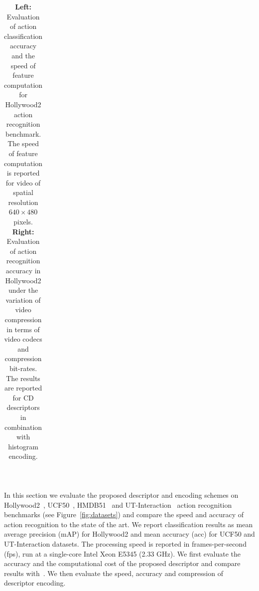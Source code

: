 \documentclass[10pt,twocolumn,letterpaper]{article}
\begin{document}
\begin{table}[t!]
\begin{center}
\begin{tabular}{p{}p{}}
\end{tabular}
\mbox{}\vspace{.1cm}\\
\caption{{\bf Left:} Evaluation of action classification accuracy and the speed of feature computation for Hollywood2 action recognition benchmark. The speed of feature computation is reported for video of spatial resolution $640\times480$ pixels.
{\bf Right:} Evaluation of action recognition accuracy in Hollywood2 under the variation of video compression in terms of video codecs and compression bit-rates. The results are reported for CD descriptors in combination with histogram encoding.
\vspace{-.4cm}}
\label{tab:HWD2}
\end{center}
\end{table}


In this section we evaluate the proposed descriptor and encoding schemes on Hollywood2~\cite{Marszalek09}, UCF50~\cite{Reddy12}, HMDB51~\cite{Kuehne11} and UT-Interaction~\cite{Ryoo10} action recognition benchmarks (see Figure~\ref{fig:datasets}) and compare the speed and accuracy of action recognition  to the state of the art. We report classification results as mean average precision (mAP) for Hollywood2 and mean accuracy (acc) for UCF50 and UT-Interaction datasets. The processing speed is reported in frames-per-second (fps), run at a single-core Intel Xeon E5345 (2.33 GHz). We first evaluate the accuracy and the computational cost of the proposed descriptor and compare results with~\cite{Wang12}. We then evaluate the speed, accuracy and compression of descriptor encoding.

\end{document}
